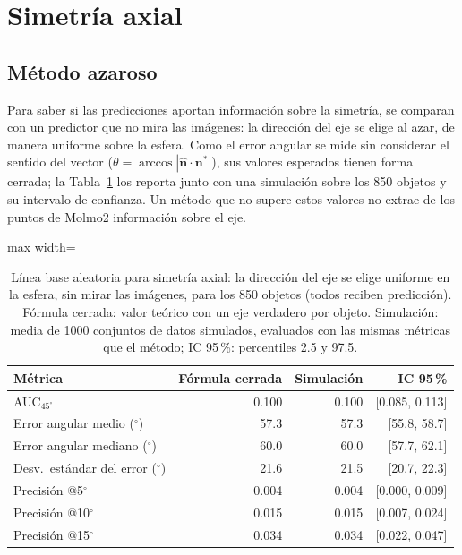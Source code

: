 \newpage
\section{Simetría axial}
\label{sec:sm_res_eje}

\newpage
\subsection{Método azaroso}

Para saber si las predicciones aportan información sobre la simetría, se comparan con
un predictor que no mira las imágenes: la dirección del eje se elige al azar, de
manera uniforme sobre la esfera. Como el error angular se mide sin considerar el
sentido del vector ($\theta=\arccos|\hat{\mathbf{n}}\cdot\mathbf{n}^*|$), sus
valores esperados tienen forma cerrada; la Tabla~\ref{tab:axis_azar} los reporta
junto con una simulación sobre los 850 objetos y su intervalo de confianza. Un
método que no supere estos valores no extrae de los puntos de Molmo2 información
sobre el eje.



\begin{table}[htbp]
\centering
\caption{Línea base aleatoria para simetría axial: la dirección del eje se elige uniforme en la esfera, sin mirar las imágenes, para los 850 objetos (todos reciben predicción). Fórmula cerrada: valor teórico con un eje verdadero por objeto. Simulación: media de 1000 conjuntos de datos simulados, evaluados con las mismas métricas que el método; IC 95\,\%: percentiles 2.5 y 97.5.}
\label{tab:axis_azar}
\begin{adjustbox}{max width=\textwidth}
\begin{tabular}{lrrr}
\toprule
Métrica & Fórmula cerrada & Simulación & IC 95\,\% \\
\midrule
AUC$_{45^\circ}$ & 0.100 & 0.100 & [0.085, 0.113] \\
Error angular medio ($^\circ$) & 57.3 & 57.3 & [55.8, 58.7] \\
Error angular mediano ($^\circ$) & 60.0 & 60.0 & [57.7, 62.1] \\
Desv.\ estándar del error ($^\circ$) & 21.6 & 21.5 & [20.7, 22.3] \\
Precisión @5$^\circ$ & 0.004 & 0.004 & [0.000, 0.009] \\
Precisión @10$^\circ$ & 0.015 & 0.015 & [0.007, 0.024] \\
Precisión @15$^\circ$ & 0.034 & 0.034 & [0.022, 0.047] \\
\bottomrule
\end{tabular}
\end{adjustbox}
\end{table}




